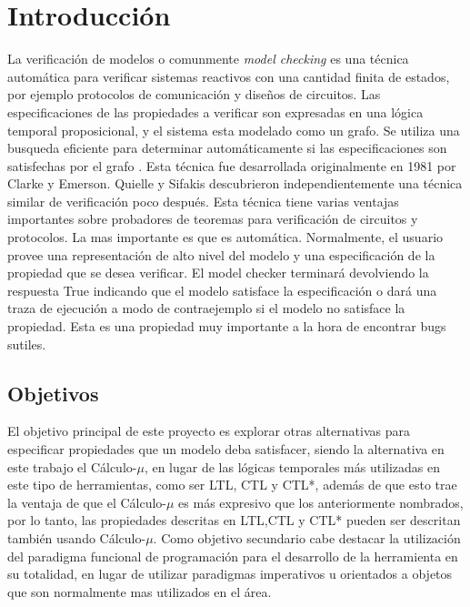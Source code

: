 \chapter{Introducción}

La verificación de modelos o comunmente \emph{model checking} es una técnica automática para verificar sistemas reactivos con una cantidad finita de estados, por ejemplo protocolos de comunicación y diseños de circuitos. Las especificaciones de las propiedades a verificar son expresadas en una lógica temporal proposicional, y el sistema esta modelado como un grafo. Se utiliza una busqueda eficiente para determinar automáticamente si las especificaciones son satisfechas por el grafo \cite{Clarke:5}. Esta técnica fue desarrollada originalmente en 1981 por Clarke y Emerson. Quielle y Sifakis descubrieron independientemente una técnica similar de verificación poco después.
Esta técnica tiene varias ventajas importantes sobre probadores de teoremas para verificación de circuitos y protocolos. La mas importante es que es automática. Normalmente, el usuario provee una representación de alto nivel del modelo y una especificación de la propiedad que se desea verificar. El model checker terminará devolviendo la respuesta True indicando que el modelo satisface la especificación o dará una traza de ejecución a modo de contraejemplo si el modelo no satisface la propiedad. Esta es una propiedad muy importante a la hora de encontrar bugs sutiles.

\section{Objetivos}
El objetivo principal de este proyecto es explorar otras alternativas para especificar propiedades que un modelo deba satisfacer, siendo la alternativa en este trabajo el Cálculo-$\mu$, en lugar de las lógicas temporales más utilizadas en este tipo de herramientas, como ser LTL, CTL y CTL*, además de que esto trae la ventaja de que el Cálculo-$\mu$ es más expresivo que los anteriormente nombrados, por lo tanto, las propiedades descritas en LTL,CTL y CTL* pueden ser descritan también usando Cálculo-$\mu$.
Como objetivo secundario cabe destacar la utilización del paradigma funcional de programación para el desarrollo de la herramienta en su totalidad, en lugar de utilizar paradigmas imperativos u orientados a objetos que son normalmente mas utilizados en el área.

